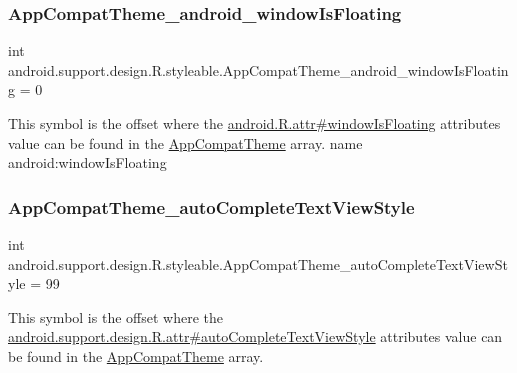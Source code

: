 \subsubsection{\texorpdfstring{App\+Compat\+Theme\+\_\+android\+\_\+window\+Is\+Floating}{AppCompatTheme\_android\_windowIsFloating}}
{\footnotesize\ttfamily int android.\+support.\+design.\+R.\+styleable.\+App\+Compat\+Theme\+\_\+android\+\_\+window\+Is\+Floating = 0\hspace{0.3cm}{\ttfamily [static]}}

This symbol is the offset where the \hyperlink{}{android.\+R.\+attr\#window\+Is\+Floating} attribute\textquotesingle{}s value can be found in the \hyperlink{classandroid_1_1support_1_1design_1_1R_1_1styleable_afb351dc8de20cbd4c89abe360373010c}{App\+Compat\+Theme} array.  name android\+:window\+Is\+Floating \mbox{\label{classandroid_1_1support_1_1design_1_1R_1_1styleable_ac4ebe90582d8572ba360303f2afe7100}} 
\subsubsection{\texorpdfstring{App\+Compat\+Theme\+\_\+auto\+Complete\+Text\+View\+Style}{AppCompatTheme\_autoCompleteTextViewStyle}}
{\footnotesize\ttfamily int android.\+support.\+design.\+R.\+styleable.\+App\+Compat\+Theme\+\_\+auto\+Complete\+Text\+View\+Style = 99\hspace{0.3cm}{\ttfamily [static]}}

This symbol is the offset where the \hyperlink{classandroid_1_1support_1_1design_1_1R_1_1attr_aac0df944af42113f0bd554f81b7c03f4}{android.\+support.\+design.\+R.\+attr\#auto\+Complete\+Text\+View\+Style} attribute\textquotesingle{}s value can be found in the \hyperlink{classandroid_1_1support_1_1design_1_1R_1_1styleable_afb351dc8de20cbd4c89abe360373010c}{App\+Compat\+Theme} array.

